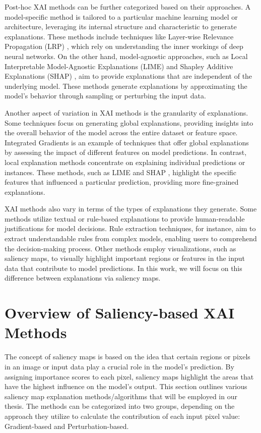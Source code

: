 Post-hoc XAI methods can be further categorized based on their approaches. A model-specific method is tailored to a particular machine learning model or architecture, leveraging its internal structure and characteristic to generate explanations. These methods include techniques like Layer-wise Relevance Propagation (LRP) \cite{lrp}, which rely on understanding the inner workings of deep neural networks. On the other hand, model-agnostic approaches, such as Local Interpretable Model-Agnostic Explanations (LIME) \cite{lime} and Shapley Additive Explanations (SHAP) \cite{shap}, aim to provide explanations that are independent of the underlying model. These methods generate explanations by approximating the model's behavior through sampling or perturbing the input data.

Another aspect of variation in XAI methods is the granularity of explanations. Some techniques focus on generating global explanations, providing insights into the overall behavior of the model across the entire dataset or feature space. Integrated Gradients \cite{IG} is an example of techniques that offer global explanations by assessing the impact of different features on model predictions. In contrast, local explanation methods concentrate on explaining individual predictions or instances. These methods, such as LIME \cite{lime} and SHAP \cite{shap}, highlight the specific features that influenced a particular prediction, providing more fine-grained explanations.

XAI methods also vary in terms of the types of explanations they generate. Some methods utilize textual or rule-based explanations to provide human-readable justifications for model decisions. Rule extraction techniques, for instance, aim to extract understandable rules from complex models, enabling users to comprehend the decision-making process. Other methods employ visualizations, such as saliency maps, to visually highlight important regions or features in the input data that contribute to model predictions. In this work, we will focus on this difference between explanations via saliency maps. 

\section{Overview of Saliency-based XAI Methods}
\label{sec:saliencyMapOverview}
The concept of saliency maps \cite{saliencyMaps} is based on the idea that certain regions or pixels in an image or input data play a crucial role in the model's prediction. By assigning importance scores to each pixel, saliency maps highlight the areas that have the highest influence on the model's output. This section outlines various saliency map explanation methods/algorithms that will be employed in our thesis. The methods can be categorized into two groups, depending on the approach they utilize to calculate the contribution of each input pixel value: Gradient-based and Perturbation-based.
 

